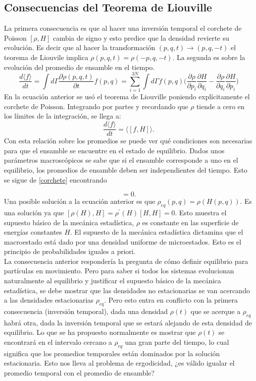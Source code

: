 \subsection{Consecuencias del Teorema de Liouville}
La primera consecuencia es que al hacer una inversión temporal el corchete de Poisson $[\rho, H]$ cambia de signo y esto predice que la densidad revierte su evolución. Es decir que al hacer la transformación $(p,q,t) \to (p,q,-t)$ el teorema de Liouvile implica $\rho(p,q,t)=\rho(-p,q,-t)$.
La segunda es sobre la evolución del promedio de ensamble en el tiempo.
\begin{equation} \label{corchete}
\frac{d \langle f \rangle}{dt}= \int d \Gamma \frac{\partial \rho(p,q,t)}{\partial t} f(p,q)= \sum_{i=1}^{3N} \int d\Gamma f(p,q) \Big( \frac{\partial \rho}{\partial p_{i}}\frac{\partial H}{\partial q_{i}} - \frac{\partial \rho}{\partial q_{i}}\frac{\partial H}{\partial p_{i}}  \Big)
\end{equation}
En la ecuación anterior se usó el teorema de Liouville poniendo explícitamente el corchete de Poisson. Integrando por partes y recordando que $\rho$ tiende a cero en los límites de la integración, se llega a:
\begin{equation}
\frac{d \langle f \rangle}{dt}= \langle [f,H] \rangle.
\end{equation}
Con esta relación sobre los promedios se puede ver qué condiciones son necesarias para que el ensamble se encuentre en el estado de equilibrio. Dados unos parámetros macroscópicos se sabe que si el ensamble corresponde a uno en el equilibrio, los promedios de ensamble deben ser independientes del tiempo. Esto se sigue de \ref{corchete} encontrando 
 
\begin{equation}
[\rho_{eq}, H]=0.
\end{equation}
Una posible solución a la ecuación anterior es que $\rho_{eq}(p,q)=\rho(H(p,q))$. Es una solución ya que $[\rho(H),H]=\rho^{'}(H)[H,H]=0$. Esto muestra el supuesto básico de la mecánica estadística, $\rho$ es constante en las superficie de energías constantes $H$. El supuesto de la mecánica estadística dictamina que el macroestado está dado por una densidad uniforme de microestados. Esto es el principio de probabilidades iguales a priori.
\\
La consecuencia anterior respondería la pregunta de cómo definir equilibrio para partículas en movimiento. Pero para saber si todos los sistemas evolucionan naturalmente al equilibrio y justificar el supuesto básico de la mecánica estadística, se debe mostrar que las densidades no estacionarias se van acercando a las densidades estacionarias $\rho_{eq}$. Pero esto entra en conflicto con la primera consecuencia (inversión temporal), dada una densidad $\rho(t)$ que se acerque a $\rho_{eq}$ habrá otra, dada la inversión temporal que se estará alejando de esta densidad de equilibrio. Lo que se ha propuesto normalmente es mostrar que $\rho(t)$ se encontrará en el intervalo cercano a $\rho_{eq}$ una gran parte del tiempo, lo cual significa que los promedios temporales están dominados por la solución estacionaria. Esto nos lleva al problema de ergodicidad, ¿es válido igualar el promedio temporal con el promedio de ensamble?
\\

